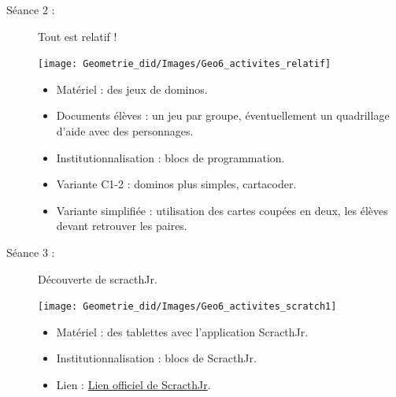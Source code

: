 \begin{exercice*}
\begin{description}
\item[Séance 2 :] Tout est relatif ! \\ [1mm]
\smallskip
   \begin{minipage}{8cm}
      \texttt{[image: Geometrie\_did/Images/Geo6\_activites\_relatif]}
   \end{minipage}
   \begin{minipage}{8.5cm}
      \begin{itemize}
         \item Matériel : des jeux de dominos.
         \item Documents élèves : un jeu par groupe, éventuellement un quadrillage d'aide avec des personnages.
         \item Institutionnalisation : blocs de programmation.
         \item Variante C1-2 : dominos plus simples, cartacoder.
         \item Variante simplifiée : utilisation des cartes coupées en deux, les élèves devant retrouver les paires.
      \end{itemize}
   \end{minipage}

\smallskip

\item[Séance 3 :] Découverte de scracthJr. \\ [1mm]
\medskip
   \begin{minipage}{8cm}
      \texttt{[image: Geometrie\_did/Images/Geo6\_activites\_scratch1]}
   \end{minipage}
   \begin{minipage}{8.5cm}
      \begin{itemize}
         \item Matériel : des tablettes avec l'application ScracthJr.
         \item Institutionnalisation : blocs de ScracthJr.
         \item Lien : \href{https://www.scratchjr.org}{Lien officiel de ScracthJr}.
      \end{itemize}
   \end{minipage}

\smallskip


\end{description}
\end{exercice*}
